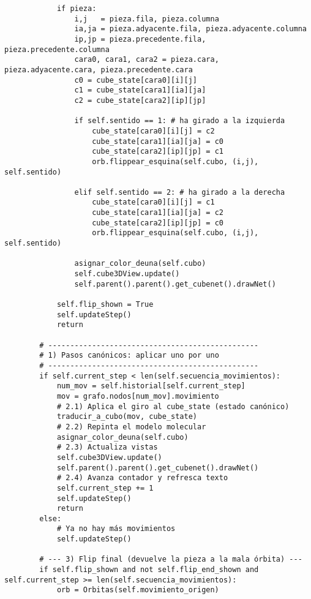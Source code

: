 \begin{lstlisting}
            if pieza:
                i,j   = pieza.fila, pieza.columna
                ia,ja = pieza.adyacente.fila, pieza.adyacente.columna
                ip,jp = pieza.precedente.fila, pieza.precedente.columna
                cara0, cara1, cara2 = pieza.cara, pieza.adyacente.cara, pieza.precedente.cara
                c0 = cube_state[cara0][i][j]
                c1 = cube_state[cara1][ia][ja]
                c2 = cube_state[cara2][ip][jp]
                    
                if self.sentido == 1: # ha girado a la izquierda
                    cube_state[cara0][i][j] = c2
                    cube_state[cara1][ia][ja] = c0
                    cube_state[cara2][ip][jp] = c1
                    orb.flippear_esquina(self.cubo, (i,j), self.sentido)
                    
                elif self.sentido == 2: # ha girado a la derecha
                    cube_state[cara0][i][j] = c1
                    cube_state[cara1][ia][ja] = c2
                    cube_state[cara2][ip][jp] = c0
                    orb.flippear_esquina(self.cubo, (i,j), self.sentido)

                asignar_color_deuna(self.cubo)
                self.cube3DView.update()
                self.parent().parent().get_cubenet().drawNet()

            self.flip_shown = True
            self.updateStep()
            return

        # ------------------------------------------------
        # 1) Pasos canónicos: aplicar uno por uno
        # ------------------------------------------------
        if self.current_step < len(self.secuencia_movimientos):
            num_mov = self.historial[self.current_step]
            mov = grafo.nodos[num_mov].movimiento
            # 2.1) Aplica el giro al cube_state (estado canónico)
            traducir_a_cubo(mov, cube_state)
            # 2.2) Repinta el modelo molecular
            asignar_color_deuna(self.cubo)
            # 2.3) Actualiza vistas
            self.cube3DView.update()
            self.parent().parent().get_cubenet().drawNet()
            # 2.4) Avanza contador y refresca texto
            self.current_step += 1
            self.updateStep()
            return
        else:
            # Ya no hay más movimientos
            self.updateStep()
            
        # --- 3) Flip final (devuelve la pieza a la mala órbita) ---
        if self.flip_shown and not self.flip_end_shown and self.current_step >= len(self.secuencia_movimientos):
            orb = Orbitas(self.movimiento_origen)


\end{lstlisting}
